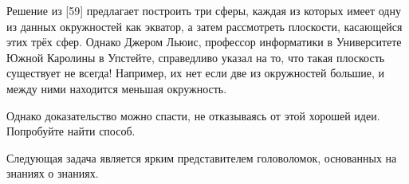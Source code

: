 Решение из [59] предлагает построить три сферы, каждая из которых имеет одну из данных окружностей как экватор, а затем рассмотреть плоскости, касающейся этих трёх сфер.
Однако Джером Льюис, профессор информатики в Университете Южной Каролины в Упстейте, справедливо указал на то, что такая плоскость существует не всегда!
Например, их нет если две из окружностей большие, и между ними находится меньшая окружность.

Однако доказательство можно спасти, не отказываясь от этой хорошей идеи.
Попробуйте найти способ.

\medskip

Следующая задача является ярким представителем головоломок, основанных на знаниях о знаниях.

